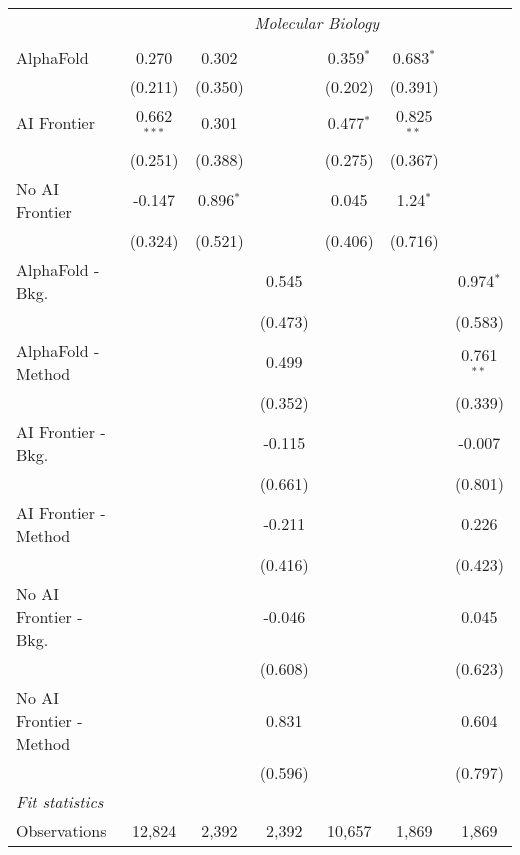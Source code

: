 \begin{tabular}{lcccccc}
 & \multicolumn{6}{c}{\textit{Molecular Biology}} \\ \\
   AlphaFold               & 0.270         & 0.302       &         & 0.359$^{*}$ & 0.683$^{*}$  &   \\   
                           & (0.211)       & (0.350)     &         & (0.202)     & (0.391)      &   \\   
   AI Frontier             & 0.662$^{***}$ & 0.301       &         & 0.477$^{*}$ & 0.825$^{**}$ &   \\   
                           & (0.251)       & (0.388)     &         & (0.275)     & (0.367)      &   \\   
   No AI Frontier          & -0.147        & 0.896$^{*}$ &         & 0.045       & 1.24$^{*}$   &   \\   
                           & (0.324)       & (0.521)     &         & (0.406)     & (0.716)      &   \\   
   AlphaFold - Bkg.        &               &             & 0.545   &             &              & 0.974$^{*}$\\   
                           &               &             & (0.473) &             &              & (0.583)\\   
   AlphaFold - Method      &               &             & 0.499   &             &              & 0.761$^{**}$\\   
                           &               &             & (0.352) &             &              & (0.339)\\   
   AI Frontier - Bkg.      &               &             & -0.115  &             &              & -0.007\\   
                           &               &             & (0.661) &             &              & (0.801)\\   
   AI Frontier - Method    &               &             & -0.211  &             &              & 0.226\\   
                           &               &             & (0.416) &             &              & (0.423)\\   
   No AI Frontier - Bkg.   &               &             & -0.046  &             &              & 0.045\\   
                           &               &             & (0.608) &             &              & (0.623)\\   
   No AI Frontier - Method &               &             & 0.831   &             &              & 0.604\\   
                           &               &             & (0.596) &             &              & (0.797)\\   
   \midrule
   \emph{Fit statistics}\\
   Observations            & 12,824        & 2,392       & 2,392   & 10,657      & 1,869        & 1,869\\  
   

\end{tabular}
